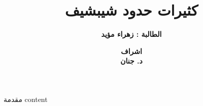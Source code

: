 


	\author{\textbf{الطالبة : زهراء مؤيد}}
	\title{\textbf{كثيرات حدود شيبشيف}}
	\date{\textbf{اشراف\\
		د. جنان}}
	
	\begin{frame}
		\maketitle
	\end{frame}
	
	\begin{frame}{مقدمة}
		content
	\end{frame}

